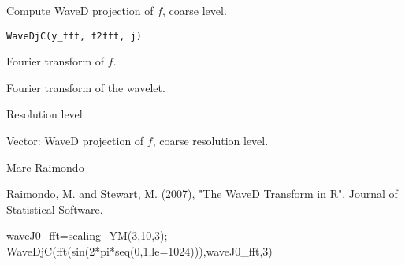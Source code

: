 \begin{Description}\relax
Compute WaveD projection of $f$, coarse level.
\end{Description}
\begin{Usage}
\begin{verbatim}
WaveDjC(y_fft, f2fft, j)
\end{verbatim}
\end{Usage}
\begin{Arguments}
\begin{ldescription}
\item[\code{y\_fft}] Fourier transform of $f$. 
\item[\code{f2fft}] Fourier transform of the wavelet.
\item[\code{j}] Resolution level. 
\end{ldescription}
\end{Arguments}
\begin{Value}
Vector:  WaveD projection of $f$, coarse resolution level.
\end{Value}
\begin{Author}\relax
Marc Raimondo
\end{Author}
\begin{References}\relax
Raimondo, M. and Stewart, M. (2007),
"The WaveD Transform in R", Journal of Statistical Software.
\end{References}
\begin{SeeAlso}\relax
{}
\end{SeeAlso}
\begin{Examples}
\begin{ExampleCode}

waveJ0_fft=scaling_YM(3,10,3);
WaveDjC(fft(sin(2*pi*seq(0,1,le=1024))),waveJ0_fft,3)
\end{ExampleCode}
\end{Examples}

